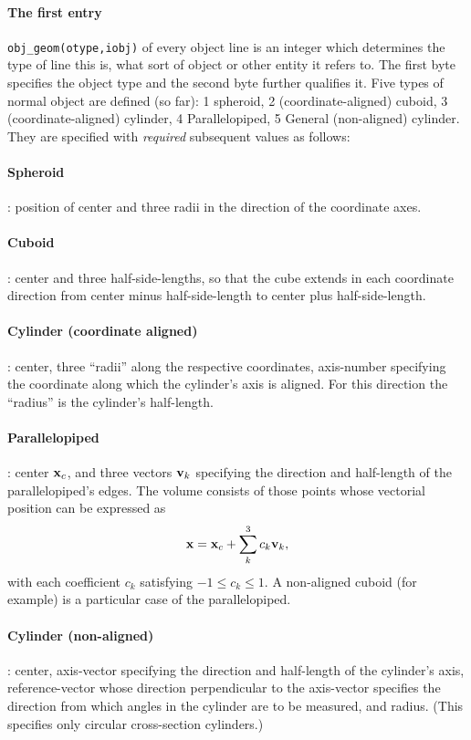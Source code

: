 \documentclass[12pt]{article}
\begin{document}
\paragraph{The first entry} 
\verb!obj_geom(otype,iobj)! of every object line is an integer which
determines the type of line this is, what sort of object or other
entity it refers to. The first byte specifies the object type and the
second byte further qualifies it. Five types of normal object are
defined (so far): 1 spheroid, 2 (coordinate-aligned) cuboid, 3
(coordinate-aligned) cylinder, 4 Parallelopiped, 5 General
(non-aligned) cylinder. They are specified with \emph{required}
subsequent values
as follows:

\paragraph{Spheroid}: position of center and three radii in the
direction of the coordinate axes.

\paragraph{Cuboid}: center and three half-side-lengths, so that the
cube extends in each coordinate direction from center minus
half-side-length to center plus half-side-length.

\paragraph{Cylinder (coordinate aligned)}: center, three ``radii''
along the respective coordinates, axis-number specifying the
coordinate along which the cylinder's axis is aligned. For this
direction the ``radius'' is the cylinder's half-length.

\paragraph{Parallelopiped}: center ${\bf x}_c$, and three vectors
${\bf v}_k$ specifying the
direction and half-length of the parallelopiped's edges. The volume
consists of those points whose vectorial position can be expressed as
\begin{equation}\label{parallelocoef}
{\bf x} = {\bf x}_c + \sum_k^3 c_k {\bf v}_k,  
\end{equation}
with each coefficient
$c_k$ satisfying $-1\le c_k \le 1$. A non-aligned cuboid (for example)
is a
particular case of the parallelopiped. 

\paragraph{Cylinder (non-aligned)}: center, axis-vector specifying the
direction and half-length of the cylinder's axis, reference-vector
whose direction perpendicular to the axis-vector specifies the
direction from which angles in the cylinder are to be measured, and
radius. (This specifies only circular cross-section cylinders.)
\end{document}
